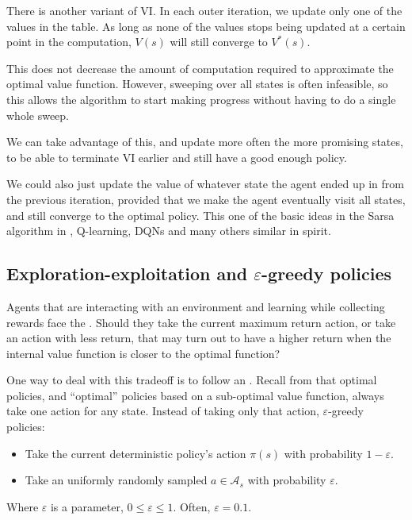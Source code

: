 \citep[Section~4.4]{sutton1998introduction}

There is another variant of \acl{VI}. In each outer iteration, we update only
one of the values in the table. As long as none of the values stops being
updated at a certain point in the computation, $V(s)$ will still converge to $V^*(s)$.

This does not decrease the amount of computation required to approximate the
optimal value function. However, sweeping over all states is often infeasible,
so this allows the algorithm to start making progress without having to do a
single whole sweep.

We can take advantage of this, and update more often the more promising states,
to be able to terminate \acl{VI} earlier and still have a good enough policy.
\citep[Section~4.5]{sutton1998introduction}

 We could also just update the value of whatever state the agent ended up in
from the previous iteration, provided that we make the agent eventually visit
all states, and still converge to the optimal policy. This one of the basic
ideas in the Sarsa algorithm in , Q-learning,
\aclp{DQN} and many others similar in spirit.

\subsection{Exploration-exploitation and \texorpdfstring{$\varepsilon$}{ε}-greedy policies}
Agents that are interacting with an environment and learning while collecting
rewards face the . Should they take the
current maximum return action, or take an action with less return, that may turn
out to have a higher return when the internal value function is closer to the
optimal function?

One way to deal with this tradeoff is to follow an
.
Recall from  that optimal policies,
and ``optimal'' policies based on a sub-optimal value function, always take one
action for any state. Instead of taking only that action, $\varepsilon$-greedy
policies:
\begin{itemize}
\item Take the current deterministic policy's action $\pi(s)$ with probability
$1-\varepsilon$.
\item Take an uniformly randomly sampled $a\in\mathcal{A}_s$ with probability
$\varepsilon$.
\end{itemize}
Where $\varepsilon$ is a parameter, $0\leq\varepsilon\leq 1$. Often,
$\varepsilon=0.1$.


